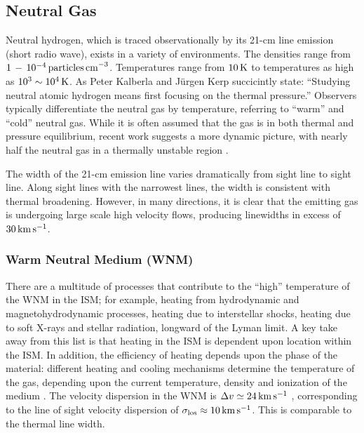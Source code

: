 \documentclass[../dissertation.tex]{subfiles}
\begin{document}
\subsection{Neutral Gas}
Neutral hydrogen, which is traced observationally by its 21-cm line emission (short radio wave), exists in a variety of environments. 
The densities range from $1 \,  - \, 10^{-4} \, {\rm particles \, cm}^{-3}$.
Temperatures range from $10 \, {\rm K}$ to temperatures as high as $10^3 \sim 10^4 \, {\rm K}$. 
As Peter Kalberla and J{\"u}rgen Kerp succicintly state: 
``Studying neutral atomic hydrogen means first focusing on the thermal pressure.'' \citep[p. 47]{2009ARA&A..47...27K}
Observers typically differentiate the neutral gas by temperature, referring to ``warm'' and ``cold'' neutral gas. While it is often assumed that the gas is in both thermal and pressure equilibrium, recent work suggests a more dynamic picture, with nearly half the neutral gas in a thermally unstable region \citep{2003ApJ...586.1067H}. 

The width of the 21-cm emission line varies dramatically from sight line to sight line. Along sight lines with the narrowest lines, the width is consistent with thermal broadening. However, in many directions, it is clear that the emitting gas is undergoing large scale high velocity flows, producing linewidths in excess of $30\,\rm km\,s^{-1}$.

\subsubsection{Warm Neutral Medium (WNM)} %
There are a multitude of processes that contribute to the ``high'' temperature of the WNM in the ISM; 
for example, heating from hydrodynamic and magnetohydrodynamic processes, heating due to interstellar shocks, heating due to soft X-rays and stellar radiation, longward of the Lyman limit.
A key take away from this list is that heating in the ISM is dependent upon location within the ISM. 
In addition, the efficiency of heating depends upon the phase of the material: 
different heating and cooling mechanisms determine the temperature of the gas, depending upon the current temperature, density and ionization of the medium \citep[p. 48]{2009ARA&A..47...27K}.
The velocity dispersion in the WNM is $\Delta v \simeq 24 \,\rm km\,s^{-1}$ \citep[p. 49]{2009ARA&A..47...27K}, corresponding to the line of sight velocity dispersion of $\sigma_{\rm los} \approx 10 \,\rm km\,s^{-1}$. This is comparable to the thermal line width.
\end{document}
